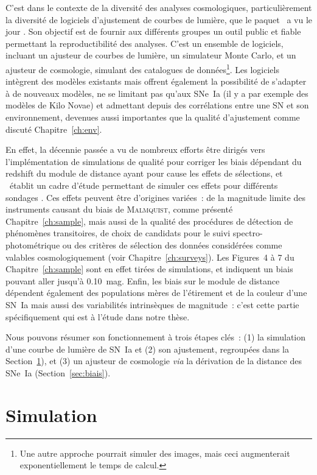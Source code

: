 \documentclass[../main/main.tex]{subfiles}
\begin{document}
C'est dans le contexte de la diversité des analyses cosmologiques,
particulièrement la diversité de logiciels d'ajustement de courbes de lumière,
que le paquet \snana\ a vu le jour \citep{kessler2009a}. Son objectif est de
fournir aux différents groupes un outil public et fiable permettant la
reproductibilité des analyses. C'est un ensemble de logiciels, incluant un
ajusteur de courbes de lumière, un simulateur Monte Carlo, et un ajusteur de
cosmologie, simulant des catalogues de données\footnote{Une autre approche
    pourrait simuler des images, mais ceci augmenterait exponentiellement le
temps de calcul.}. Les logiciels intègrent des modèles existants mais offrent
également la possibilité de s'adapter à de nouveaux modèles, ne se limitant
pas qu'aux SNe~Ia (il y a par exemple des modèles de Kilo Novae) et
admettant depuis des corrélations entre une SN et son environnement,
devenues aussi importantes que la qualité d'ajustement comme discuté
Chapitre~\ref{ch:env}.

En effet, la décennie passée a vu de nombreux efforts être dirigés vers
l'implémentation de simulations de qualité pour corriger les biais dépendant du
redshift du module de distance ayant pour cause les effets de sélections, et
\snana\ établit un cadre d'étude permettant de simuler ces effets pour
différents sondages \citep{kessler2019}. Ces effets peuvent être d'origines
variées~: de la magnitude limite des instruments causant du biais de
\textsc{Malmquist}, comme présenté Chapitre~\ref{ch:sample}, mais aussi de la
qualité des procédures de détection de phénomènes transitoires, de choix de
candidats pour le suivi spectro-photométrique ou des critères de sélection des
données considérées comme valables cosmologiquement (voir
Chapitre~\ref{ch:surveys}). Les Figures~4 à 7 du Chapitre~\ref{ch:sample} sont
en effet tirées de simulations, et indiquent un biais pouvant aller jusqu'à
\SI{0.10}{mag}. Enfin, les biais sur le module de distance dépendent également
des populations mères de l'étirement et de la couleur d'une SN~Ia mais aussi des
variabilités intrinsèques de magnitude~: c'est cette partie spécifiquement qui
est à l'étude dans notre thèse.

Nous pouvons résumer son fonctionnement à trois étapes clés~: (1) la simulation
d'une courbe de lumière de SN~Ia et (2) son ajustement, regroupées dans la
Section~\ref{sec:snanasim}), et (3) un ajusteur de cosmologie \textit{via} la
dérivation de la distance des SNe~Ia (Section~\ref{sec:biais}).

\section{Simulation}\label{sec:snanasim}
\end{document}
